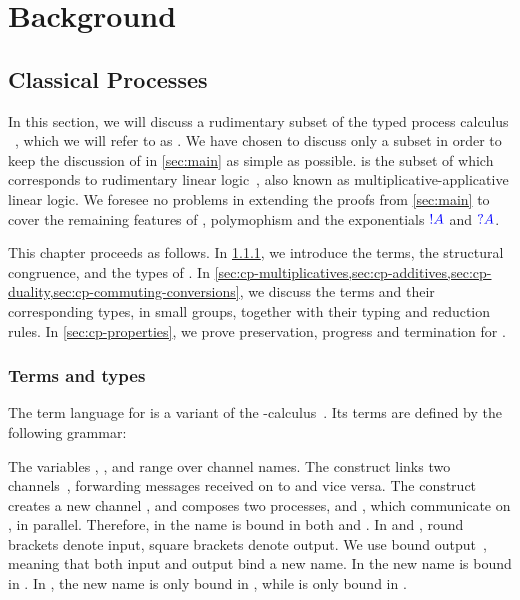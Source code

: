 \chapter{Background}
\label{sec:background}

\section{Classical Processes}
\label{sec:cp}
In this section, we will discuss a rudimentary subset of the typed process
calculus \cp~\cite{wadler2012,lindley2015semantics}, which we will refer to as
\rcp. 
We have chosen to discuss only a subset in order to keep the discussion of
\nodcap in \cref{sec:main} as simple as possible.
\rcp is the subset of \cp which corresponds to rudimentary linear
logic~\cite[RLL]{girard1992}, also known as multiplicative-applicative linear
logic. 
We foresee no problems in extending the proofs from \cref{sec:main} to
cover the remaining features of \cp, polymophism and the exponentials $\textcolor{blue}{!A}$
and $\textcolor{blue}{?A}$. 

This chapter proceeds as follows.
In \cref{sec:cp-terms-and-types}, we introduce the terms, the structural
congruence, and the types of \rcp. 
In \cref{sec:cp-multiplicatives,sec:cp-additives,sec:cp-duality,sec:cp-commuting-conversions}, 
we discuss the terms and their corresponding types, in small groups,
together with their typing and reduction rules.
In \cref{sec:cp-properties}, we prove preservation, progress and
termination for \rcp.

\subsection{Terms and types}
\label{sec:cp-terms-and-types}
The term language for \rcp is a variant of the
\textpi-calculus~\cite{milner1992b}.
Its terms are defined by the following grammar:

The variables , ,  and  range over channel names.
The construct  links two
channels~\cite{sangiorgi1996,boreale1998}, forwarding messages received on
 to  and vice versa.
The construct  creates a new channel , and composes
two processes,  and , which communicate on , in parallel.
Therefore, in  the name  is bound in both  and
.
In  and , round brackets denote
input, square brackets denote output. 
We use bound output~\cite{sangiorgi1996}, meaning that both input and output
bind a new name. 
In  the new name  is bound in .
In , the new name  is only bound in , while
 is only bound in .

